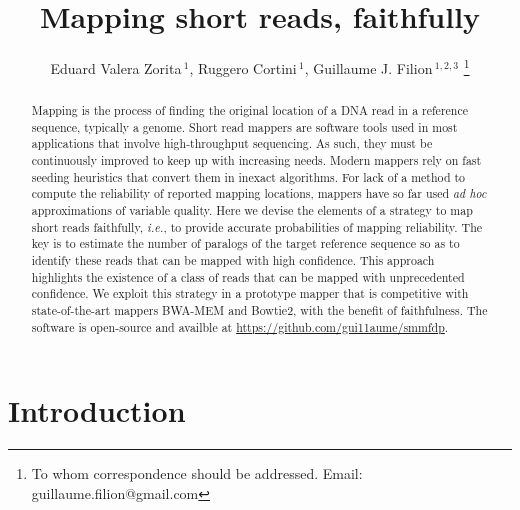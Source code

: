 \documentclass[a4,center,fleqn]{NAR}
\begin{document}
\title{Mapping short reads, faithfully}

\author{%
Eduard Valera Zorita\,$^1$,
Ruggero Cortini\,$^1$,
Guillaume J. Filion\,$^{1,2,3}$
\footnote{To whom correspondence should be addressed.
Email: guillaume.filion@gmail.com}}

\address{%
$^{1}$Center for Genomic Regulation (CRG), The Barcelona Institute
of Science and Technology, Dr. Aiguader 88, Barcelona 08003, Spain;
$^{2}$University Pompeu Fabra (UPF), Barcelona, Spain;
$^{3}$present address: Department of Biological Sciences, University
of Toronto Scarborough, Toronto, ON, Canada.}


\maketitle

\begin{abstract}
Mapping is the process of finding the original location of a DNA read in a
reference sequence, typically a genome. Short read mappers are software tools
used in most applications that involve high-throughput sequencing. As such, they
must be continuously improved to keep up with increasing needs. Modern mappers
rely on fast seeding heuristics that convert them in inexact algorithms.
For lack of a method to compute the reliability of reported mapping locations,
mappers have so far used \textit{ad hoc} approximations of variable
quality. Here we devise the elements of a strategy to map short reads
faithfully, \textit{i.e.}, to provide accurate probabilities of mapping reliability.
The key is to estimate the number of paralogs of the target reference sequence
so as to identify these reads that can be mapped with high confidence.
This approach highlights the existence of a class of reads that can be
mapped with unprecedented confidence. We exploit this strategy in a
prototype mapper that is competitive with state-of-the-art mappers BWA-MEM
and Bowtie2, with the benefit of faithfulness. The software is open-source
and availble at \url{https://github.com/gui11aume/smmfdp}.
\end{abstract}


\section{Introduction}
\end{document}
